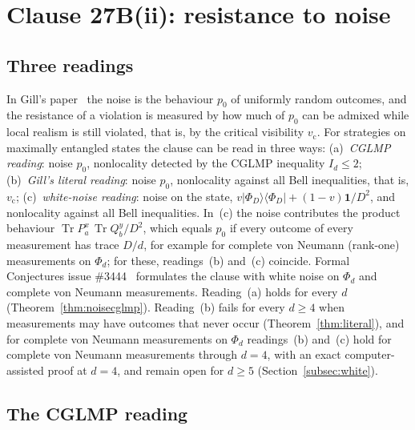 \documentclass[11pt]{article}
\theoremstyle{remark}
\numberwithin{equation}{section}
\newcommand{\Tr}{\operatorname{Tr}}
\newcommand{\one}{\mathbf{1}}
\newcommand{\vc}{v_{\mathrm c}}
\begin{document}
\section{Clause 27B(ii): resistance to noise}\label{sec:noise}

\subsection{Three readings}\label{subsec:readings}
In Gill's paper~\cite{Gill} the noise is the behaviour $p_0$ of uniformly random outcomes, and the resistance of a
violation is measured by how much of $p_0$ can be admixed while local realism is still violated, that is, by the
critical visibility $\vc$. For strategies on maximally entangled states the clause can be read in three ways:
(a)~\emph{CGLMP reading}: noise $p_0$, nonlocality detected by the CGLMP inequality $I_d\le2$;
(b)~\emph{Gill's literal reading}: noise $p_0$, nonlocality against all Bell inequalities, that is, $\vc$;
(c)~\emph{white-noise reading}: noise on the state, $v|\Phi_D\rangle\langle\Phi_D|+(1-v)\one/D^2$, and
nonlocality against all Bell inequalities. In~(c) the noise contributes the product behaviour $\Tr P^x_a\,\Tr
Q^y_b/D^2$, which equals $p_0$ if every outcome of every measurement has trace $D/d$, for example for complete von
Neumann (rank-one) measurements on $\Phi_d$; for these, readings~(b) and~(c) coincide. Formal Conjectures issue
\#3444~\cite{FC3444} formulates the clause with white noise on $\Phi_d$ and complete von Neumann measurements.
Reading~(a) holds for every $d$ (Theorem~\ref{thm:noisecglmp}). Reading~(b) fails for every $d\ge4$ when measurements
may have outcomes that never occur (Theorem~\ref{thm:literal}), and for complete von Neumann measurements on $\Phi_d$
readings~(b) and~(c) hold for complete von Neumann measurements through $d=4$, with an exact computer-assisted proof at $d=4$, and remain open for $d\ge5$ (Section~\ref{subsec:white}).

\subsection{The CGLMP reading}\label{subsec:noisecglmp}
\end{document}
